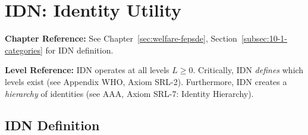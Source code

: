 \section{IDN: Identity Utility}
\label{sec:app-c-idn}

\begin{cross-reference}
\textbf{Chapter Reference:} See Chapter~\ref{sec:welfare-fepsde}, 
Section~\ref{subsec:10-1-categories} for IDN definition.

\textbf{Level Reference:} IDN operates at all levels $L \geq 0$. Critically, 
IDN \textit{defines} which levels exist (see Appendix WHO, Axiom SRL-2). 
Furthermore, IDN creates a \textit{hierarchy} of identities (see AAA, Axiom SRL-7: 
Identity Hierarchy).
\end{cross-reference}

\subsection{IDN Definition}

